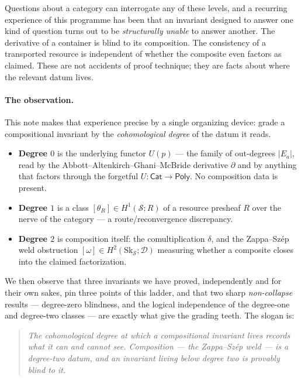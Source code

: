 \documentclass[11pt]{article}
\theoremstyle{definition}
\newcommand{\Poly}{\mathsf{Poly}}
\newcommand{\Cat}{\mathsf{Cat}}
\newcommand{\Sk}{\mathrm{Sk}}
\newcommand{\sS}{\mathcal{S}}
\newcommand{\cD}{\mathcal{D}}
\begin{document}
Questions about a category can interrogate any of these levels, and a recurring experience of this
programme has been that an invariant designed to answer one kind of question turns out to be
\emph{structurally unable} to answer another. The derivative of a container is blind to its
composition. The consistency of a transported resource is independent of whether the composite even
factors as claimed. These are not accidents of proof technique; they are facts about where the
relevant datum lives.

\paragraph{The observation.}
This note makes that experience precise by a single organizing device: grade a compositional
invariant by the \emph{cohomological degree} of the datum it reads.

\begin{itemize}
\item \textbf{Degree $0$} is the underlying functor $U(p)$ --- the family of out-degrees $|E_a|$,
read by the Abbott--Altenkirch--Ghani--McBride derivative $\partial$ and by anything that factors
through the forgetful $U\colon\Cat\to\Poly$. No composition data is present.
\item \textbf{Degree $1$} is a class $[\theta_R]\in H^1(\sS;R)$ of a resource presheaf $R$ over the
nerve of the category --- a route/reconvergence discrepancy.
\item \textbf{Degree $2$} is composition itself: the comultiplication $\delta$, and the
Zappa--Sz\'ep weld obstruction $[\omega]\in H^2(\Sk_\sS;\cD)$ measuring whether a composite closes
into the claimed factorization.
\end{itemize}

We then observe that three invariants we have proved, independently and for their own sakes, pin
three points of this ladder, and that two sharp \emph{non-collapse} results --- degree-zero
blindness, and the logical independence of the degree-one and degree-two classes --- are exactly
what give the grading teeth. The slogan is:

\begin{quote}
\emph{The cohomological degree at which a compositional invariant lives records what it can and
cannot see. Composition --- the Zappa--Sz\'ep weld --- is a degree-two datum, and an invariant
living below degree two is provably blind to it.}
\end{quote}
\end{document}
